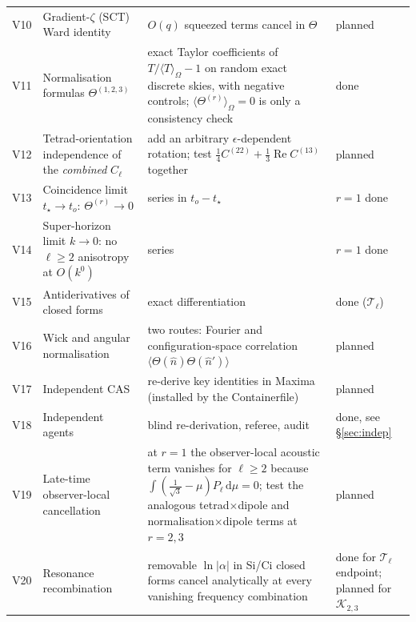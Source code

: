 \documentclass[11pt]{article}
\theoremstyle{definition}
\theoremstyle{remark}
\newcommand{\eps}{\epsilon}
\newcommand{\nhat}{\hat n}
\newcommand{\dd}{\mathrm{d}}
\newcommand{\sky}[1]{\langle #1\rangle_{\Omega}}
\newcommand{\ens}[1]{\langle #1\rangle}
\begin{document}
\begin{longtable}{@{}p{0.6cm}p{6.4cm}p{6.0cm}p{1.7cm}@{}}
V10 & Gradient-$\zeta$ (SCT) Ward identity & $O(q)$ squeezed terms cancel in $\Theta$ & planned\\
V11 & Normalisation formulas $\Theta^{(1,2,3)}$ & exact Taylor coefficients of $T/\sky{T}-1$ on random exact discrete skies, with negative controls; $\sky{\Theta^{(r)}}=0$ is only a consistency check & done\\
V12 & Tetrad-orientation independence of the \emph{combined} $C_\ell$ & add an arbitrary $\eps$-dependent rotation; test $\tfrac14C^{(22)}+\tfrac13\operatorname{Re}C^{(13)}$ together & planned\\
V13 & Coincidence limit $t_\star\to t_o$: $\Theta^{(r)}\to0$ & series in $t_o-t_\star$ & $r{=}1$ done\\
V14 & Super-horizon limit $k\to0$: no $\ell\ge2$ anisotropy at $O(k^0)$ & series & $r{=}1$ done\\
V15 & Antiderivatives of closed forms & exact differentiation & done ($\mathcal T_\ell$)\\
V16 & Wick and angular normalisation & two routes: Fourier and configuration-space correlation $\ens{\Theta(\nhat)\Theta(\nhat')}$ & planned\\
V17 & Independent CAS & re-derive key identities in Maxima (installed by the Containerfile) & planned\\
V18 & Independent agents & blind re-derivation, referee, audit & done, see \S\ref{sec:indep}\\
V19 & Late-time observer-local cancellation & at $r{=}1$ the observer-local acoustic term vanishes for $\ell\ge2$ because $\int(\tfrac1{\sqrt3}-\mu)P_\ell\,\dd\mu=0$; test the analogous tetrad$\times$dipole and normalisation$\times$dipole terms at $r{=}2,3$ & planned\\
V20 & Resonance recombination & removable $\ln|\alpha|$ in Si/Ci closed forms cancel analytically at every vanishing frequency combination & done for $\mathcal T_\ell$ endpoint; planned for $\mathcal K_{2,3}$\\
\bottomrule
\end{longtable}

\end{document}

